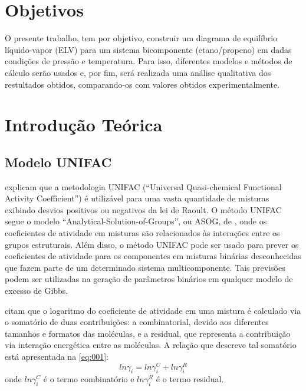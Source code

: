 \section{Objetivos}

O presente trabalho, tem por objetivo, construir um diagrama de equilíbrio
líquido-vapor (ELV) para um sistema bicomponente (etano/propeno) em dadas
condições de pressão e temperatura. Para isso, diferentes modelos e
métodos de cálculo serão usados e, por fim, será realizada uma análise
qualitativa dos restultados obtidos, comparando-os com valores obtidos experimentalmente.

\section{Introdução Teórica}

\subsection{Modelo UNIFAC}

 explicam que a metodologia UNIFAC 
(“Universal Quasi-chemical Functional Activity Coefficient”)
é utilizável para uma vasta quantidade de misturas exibindo 
desvios positivos ou negativos da lei de Raoult. O método 
UNIFAC segue o modelo “Analytical-Solution-of-Groups”, ou ASOG,
de , onde os coeficientes de atividade
em misturas são relacionados às interações entre os 
grupos estruturais. Além disso, o método UNIFAC pode 
ser usado para prever os coeficientes de atividade para 
os componentes em misturas binárias desconhecidas que
fazem parte de um determinado sistema multicomponente. 
Tais previsões podem ser utilizadas na geração de parâmetros
 binários em qualquer modelo de excesso de Gibbs.


 citam que o logaritmo do coeficiente de
atividade em uma mistura é calculado via o somatório de duas
contribuições: a combinatorial, devido aos diferentes tamanhos e formatos das
moléculas, e a residual, que representa a contribuição via interação energética entre as
moléculas. A relação que descreve tal somatório está apresentada na
\autoref{eq:001}:
\begin{equation}\label{eq:001}ln\gamma_i = ln\gamma_i^C +
ln\gamma_i^R\end{equation}
onde
$ln\gamma_i^C$ é o termo combinatório e $ln\gamma_i^R$ 
é o termo residual.


